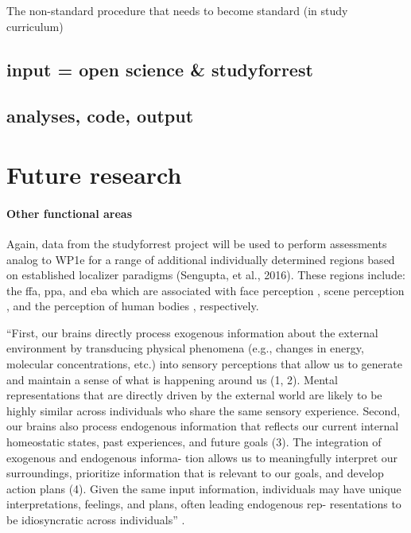 

%
The non-standard procedure that needs to become standard (in study curriculum)

\subsection{input = open science \& studyforrest}

\subsection{analyses, code, output}



\section{Future research}

\paragraph{Other functional areas}

Again, data from the studyforrest project will be used to perform assessments
analog to WP1e for a range of additional individually determined regions based
on established localizer paradigms (Sengupta, et al., 2016).
%
These regions include: the \ac{ffa}, \ac{ppa}, and \ac{eba}  which are
associated with face perception \citep{kanwisher1997ffa,
pitcher2011occipitalfacearea}, scene perception \citep{epstein1998ppa}, and the
perception of human bodies \citep{downing2001bodyarea}, respectively.

``First, our brains directly process exogenous information about the external
environment by transducing physical phenomena (e.g., changes in energy,
molecular concentrations, etc.) into sensory perceptions that allow us to
generate and maintain a sense of what is happening around us (1, 2). Mental
representations that are directly driven by the external world are likely to be
highly similar across individuals who share the same sensory experience. Second,
our brains also process endogenous information that reflects our current
internal homeostatic states, past experiences, and future goals (3). The
integration of exogenous and endogenous informa- tion allows us to meaningfully
interpret our surroundings, prioritize information that is relevant to our
goals, and develop action plans (4). Given the same input information,
individuals may have unique interpretations, feelings, and plans, often leading
endogenous rep- resentations to be idiosyncratic across individuals''
\citep{chang2021endogenous}.

